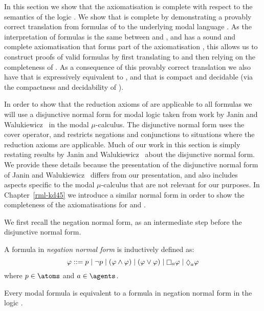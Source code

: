 In this section we show that the axiomatisation \axiomRmlK{} is complete with respect to the semantics of the logic \logicRmlK{}.
We show that \axiomRmlK{} is complete by demonstrating a provably correct translation from formulas of \langRml{} to the underlying modal language \langMl{}.
As the interpretation of \langMl{} formulas is the same between \logicRmlK{} and \logicK{}, and \logicK{} has a sound and complete axiomatisation \axiomK{} that forms part of the axiomatisation \logicRmlK{}, this allows us to construct proofs of valid \langRml{} formulas by first translating to \langMl{} and then relying on the completeness of \axiomK{}.
As a consequence of this provably correct translation we also have that \logicRmlK{} is expressively equivalent to \logicK{}, and that \logicRmlK{} is compact and decidable (via the compactness and decidability of \logicK{}).

In order to show that the reduction axioms of \axiomRmlK{} are applicable to all \langRml{} formulas we will use a disjunctive normal form for modal logic taken from work by Janin and Walukiewicz~\cite{janin:1995} in the modal $\mu$-calculus.
The disjunctive normal form uses the cover operator, and restricts negations and conjunctions to situations where the reduction axioms are applicable.
Much of our work in this section is simply restating results by Janin and Walukiewicz~\cite{janin:1995} about the disjunctive normal form.
We provide these details because the presentation of the disjunctive normal form of Janin and Walukiewicz~\cite{janin:1995} differs from our presentation, and also includes aspects specific to the modal $\mu$-calculus that are not relevant for our purposes.
In Chapter~\ref{rml-kd45} we introduce a similar normal form in order to show the completeness of the axiomatisations for \logicRmlKFF{} and \logicRmlKD{}.

We first recall the negation normal form, as an intermediate step before the disjunctive normal form.

\pagebreak

\begin{definition}
A formula in {\em negation normal form} is inductively defined as:
$$
\phi ::= \atomP \mid
         \lnot \atomP \mid
         (\phi \land \phi) \mid
         (\phi \lor \phi) \mid
         \necessaryA \phi \mid
         \possibleA \phi
$$
where $\atomP \in \atoms$ and $\agentA \in \agents$.
\end{definition}

\begin{lemma}\label{nnf-equivalent}
Every modal formula is equivalent to a formula in negation normal form in the logic \logicK{}.
\end{lemma}

